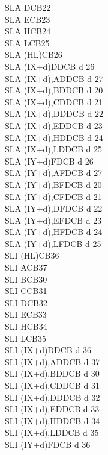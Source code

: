 \documentclass[12pt,twoside,openright,a4paper]{book}
\begin{document}
\begin{multicols}{3}
{\begin{tabbing}
		SLA D\>CB22\\
		SLA E\>CB23\\
		SLA H\>CB24\\
		SLA L\>CB25\\
		SLA (HL)\>CB26\\
		SLA (IX+d)\>DDCB d 26\\
		SLA (IX+d),A\UNDOC\>DDCB d 27\\
		SLA (IX+d),B\UNDOC\>DDCB d 20\\
		SLA (IX+d),C\UNDOC\>DDCB d 21\\
		SLA (IX+d),D\UNDOC\>DDCB d 22\\
		SLA (IX+d),E\UNDOC\>DDCB d 23\\
		SLA (IX+d),H\UNDOC\>DDCB d 24\\
		SLA (IX+d),L\UNDOC\>DDCB d 25\\
		SLA (IY+d)\>FDCB d 26\\
		SLA (IY+d),A\UNDOC\>FDCB d 27\\
		SLA (IY+d),B\UNDOC\>FDCB d 20\\
		SLA (IY+d),C\UNDOC\>FDCB d 21\\
		SLA (IY+d),D\UNDOC\>FDCB d 22\\
		SLA (IY+d),E\UNDOC\>FDCB d 23\\
		SLA (IY+d),H\UNDOC\>FDCB d 24\\
		SLA (IY+d),L\UNDOC\>FDCB d 25\\
		SLI (HL)\UNDOC\>CB36\\
		SLI A\UNDOC\>CB37\\
		SLI B\UNDOC\>CB30\\
		SLI C\UNDOC\>CB31\\
		SLI D\UNDOC\>CB32\\
		SLI E\UNDOC\>CB33\\
		SLI H\UNDOC\>CB34\\
		SLI L\UNDOC\>CB35\\
		SLI (IX+d)\UNDOC\>DDCB d 36\\
		SLI (IX+d),A\UNDOC\>DDCB d 37\\
		SLI (IX+d),B\UNDOC\>DDCB d 30\\
		SLI (IX+d),C\UNDOC\>DDCB d 31\\
		SLI (IX+d),D\UNDOC\>DDCB d 32\\
		SLI (IX+d),E\UNDOC\>DDCB d 33\\
		SLI (IX+d),H\UNDOC\>DDCB d 34\\
		SLI (IX+d),L\UNDOC\>DDCB d 35\\
		SLI (IY+d)\UNDOC\>FDCB d 36\\

\end{tabbing}}
\end{multicols}
\end{document}
